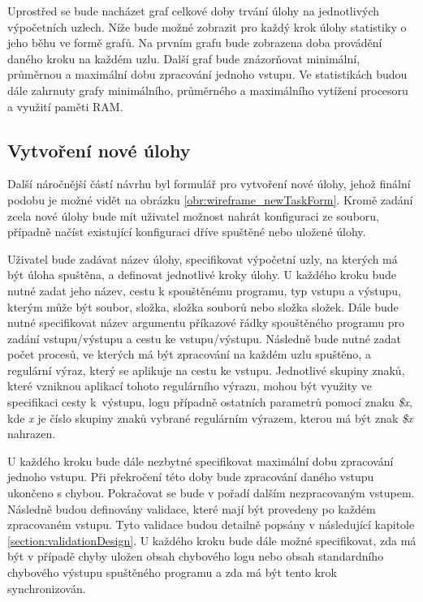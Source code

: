 Uprostřed se bude nacházet graf celkové doby trvání úlohy na jednotlivých výpočetních uzlech. Níže bude možné zobrazit pro každý krok úlohy statistiky o jeho běhu ve formě grafů. Na prvním grafu bude zobrazena doba provádění daného kroku na každém uzlu. Další graf bude znázorňovat minimální, průměrnou a maximální dobu zpracování jednoho vstupu. Ve statistikách budou dále zahrnuty grafy minimálního, průměrného a maximálního vytížení procesoru a využití paměti RAM. 

\subsection*{Vytvoření nové úlohy}
\label{subsection:newTaskForm}

Další náročnější částí návrhu byl formulář pro vytvoření nové úlohy, jehož finální podobu je možné vidět na obrázku \ref{obr:wireframe_newTaskForm}. Kromě zadání zcela nové úlohy bude mít uživatel možnost nahrát konfiguraci ze souboru, případně načíst existující konfiguraci dříve spuštěné nebo uložené úlohy. 

Uživatel bude zadávat název úlohy, specifikovat výpočetní uzly, na kterých má být úloha spuštěna, a definovat jednotlivé kroky úlohy. U každého kroku bude nutné zadat jeho název, cestu k spouštěnému programu, typ vstupu a výstupu, kterým může být soubor, složka, složka souborů nebo složka složek. Dále bude nutné specifikovat název argumentu příkazové řádky spouštěného programu pro zadání vstupu/výstupu  a cestu ke vstupu/výstupu. Následně bude nutné zadat počet procesů, ve kterých má být zpracování na každém uzlu spuštěno, a regulární výraz, který se aplikuje na cestu ke vstupu. Jednotlivé skupiny znaků, které vzniknou aplikací tohoto regulárního výrazu, mohou být využity ve specifikaci cesty k~výstupu, logu případně ostatních parametrů pomocí znaku \textit{\$x}, kde \textit{x} je číslo skupiny znaků vybrané regulárním výrazem, kterou má být znak \textit{\$x} nahrazen.

U každého kroku bude dále nezbytné specifikovat maximální dobu zpracování jednoho vstupu. Při překročení této doby bude zpracování daného vstupu ukončeno s chybou. Pokračovat se bude v pořadí dalším nezpracovaným vstupem. Následně budou definovány validace, které mají být provedeny po každém zpracovaném vstupu. Tyto validace budou detailně popsány v následující kapitole \ref{section:validationDesign}. U každého kroku bude dále možné specifikovat, zda má být v případě chyby uložen obsah chybového logu nebo obsah standardního chybového výstupu spuštěného programu a zda má být tento krok synchronizován.

